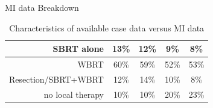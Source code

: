 \begin{frame}{MI data Breakdown}
\begin{table}[!ht]
{\begin{tabular}{|r|c|c|c|c|}
SBRT alone                                        & 13\%                                                                  & 12\%                                                      & 9\%                                                                      & 8\%                                                          \\ \hline
WBRT                                              & 60\%                                                                  & 59\%                                                      & 52\%                                                                     & 53\%                                                         \\ \hline
Resection/SBRT+WBRT                               & 12\%                                                                  & 14\%                                                      & 10\%                                                                     & 8\%                                                          \\ \hline
no local therapy                                  & 10\%                                                                  & 10\%                                                      & 20\%                                                                     & 23\%                                                         \\ \hline
\end{tabular}
}
\caption{Characteristics of available case data versus MI data}
\label{table:chartab}
\end{table}
 
\end{frame}










